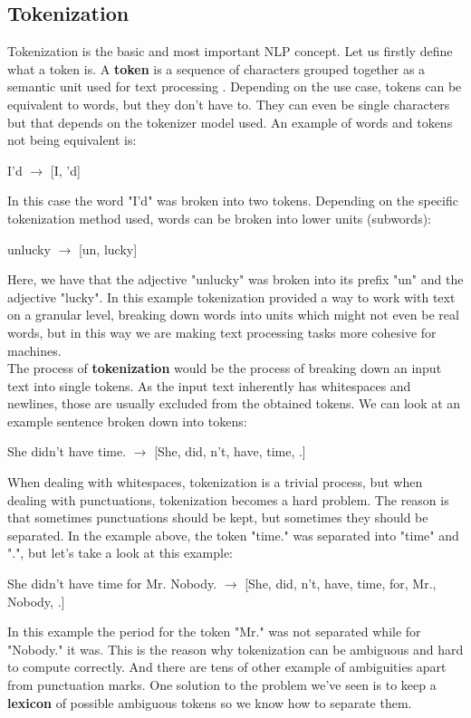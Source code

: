 \documentclass[12pt]{article}
\numberwithin{equation}{section}
\begin{document}
\begin{spacing}{1.5}
	\subsection{Tokenization}
	Tokenization is the basic and most important NLP concept. Let us firstly define what a token is. A \textbf{token} is a sequence of characters grouped together as a semantic unit used for text processing \cite{stanford_NLP}. Depending on the use case,  tokens can be equivalent to words, but they don't have to. They can even be single characters but that depends on the tokenizer model used. An example of words and tokens not being equivalent is:
	\begin{center}
		I'd $\rightarrow$ [I, 'd]
	\end{center}
	In this case the word "I'd" was broken into two tokens. Depending on the specific tokenization method used, words can be broken into lower units (subwords):
	\begin{center}
		unlucky $\rightarrow$ [un, lucky]
	\end{center}
	Here, we have that the adjective "unlucky" was broken into its prefix "un" and the adjective "lucky". In this example tokenization provided a way to work with text on a granular level, breaking down words into units which might not even be real words, but in this way we are making text processing tasks more cohesive for machines. \\
	The process of \textbf{tokenization} would be the process of breaking down an input text into single tokens. As the input text inherently has whitespaces and newlines, those are usually excluded from the obtained tokens. We can look at an example sentence broken down into tokens: 
	\begin{center}
		She didn't have time. $\rightarrow$ [She, did, n't, have, time, .]
	\end{center}
	When dealing with whitespaces, tokenization is a trivial process, but when dealing with punctuations, tokenization becomes a hard problem. The reason is that sometimes punctuations should be kept, but sometimes they should be separated. In the example above, the token "time." was separated into "time" and ".", but let's take a look at this example:
	\begin{center}
		She didn't have time for Mr. Nobody. $\rightarrow$ [She, did, n't, have, time, for, Mr., Nobody, .]
	\end{center}
	In this example the period for the token "Mr." was not separated while for "Nobody." it was. This is the reason why tokenization can be ambiguous and hard to compute correctly. And there are tens of other example of ambiguities apart from punctuation marks. One solution to the problem we've seen is to keep a \textbf{lexicon} of possible ambiguous tokens so we know how to separate them.
	

\end{spacing}
\end{document}
